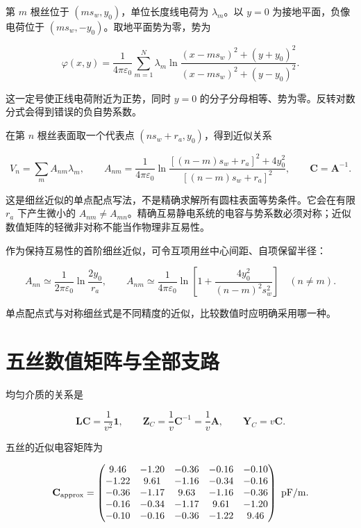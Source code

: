 \documentclass[
  11pt,
  a4paper,
  oneside,
  openany]{report}
\numberwithin{equation}{chapter}
\begin{document}
第 \(m\) 根丝位于 \((ms_w,y_0)\)，单位长度线电荷为 \(\lambda_m\)。以
\(y=0\) 为接地平面，负像电荷位于 \((ms_w,-y_0)\)。取地平面势为零，势为

\nopagebreak[3]
\begin{equation}
\varphi(x,y)=\frac1{4\pi\varepsilon_0}\sum_{m=1}^{N}\lambda_m
\ln\frac{(x-ms_w)^2+(y+y_0)^2}{(x-ms_w)^2+(y-y_0)^2}.
\end{equation}

这一定号使正线电荷附近为正势，同时 \(y=0\)
的分子分母相等、势为零。反转对数分式会得到错误的负自势系数。

在第 \(n\) 根丝表面取一个代表点 \((ns_w+r_a,y_0)\)，得到近似关系

\nopagebreak[3]
\begin{equation}
V_n=\sum_m A_{nm}\lambda_m,\qquad
A_{nm}=\frac1{4\pi\varepsilon_0}
\ln\frac{[(n-m)s_w+r_a]^2+4y_0^2}{[(n-m)s_w+r_a]^2},
\qquad \mathbf C=\mathbf A^{-1}.
\end{equation}

这是细丝近似的单点配点写法，不是精确求解所有圆柱表面等势条件。它会在有限
\(r_a\) 下产生微小的
\(A_{nm}\ne A_{mn}\)。精确互易静电系统的电容与势系数必须对称；近似数值矩阵的轻微非对称不能当作物理非互易性。

作为保持互易性的首阶细丝近似，可令互项用丝中心间距、自项保留半径：

\nopagebreak[3]
\begin{equation}
A_{nn}\simeq\frac1{2\pi\varepsilon_0}\ln\frac{2y_0}{r_a},\qquad
A_{nm}\simeq\frac1{4\pi\varepsilon_0}\ln\left[1+\frac{4y_0^2}{(n-m)^2s_w^2}\right]\quad(n\ne m).
\end{equation}

单点配点式与对称细丝式是不同精度的近似，比较数值时应明确采用哪一种。

\section{五丝数值矩阵与全部支路}\label{sec-wire-matrices}

均匀介质的关系是

\nopagebreak[3]
\begin{equation}
\mathbf L\mathbf C=\frac1{v^2}\mathbf1,\qquad
\mathbf Z_C=\frac1v\mathbf C^{-1}=\frac1v\mathbf A,
\qquad \mathbf Y_C=v\mathbf C.
\end{equation}

五丝的近似电容矩阵为

\nopagebreak[3]
\begin{equation}
\mathbf C_{\rm approx}=
\begin{pmatrix}
9.46&-1.20&-0.36&-0.16&-0.10\\
-1.22&9.61&-1.16&-0.34&-0.16\\
-0.36&-1.17&9.63&-1.16&-0.36\\
-0.16&-0.34&-1.17&9.61&-1.20\\
-0.10&-0.16&-0.36&-1.22&9.46
\end{pmatrix}\ {\rm pF/m}.
\end{equation}
\end{document}
